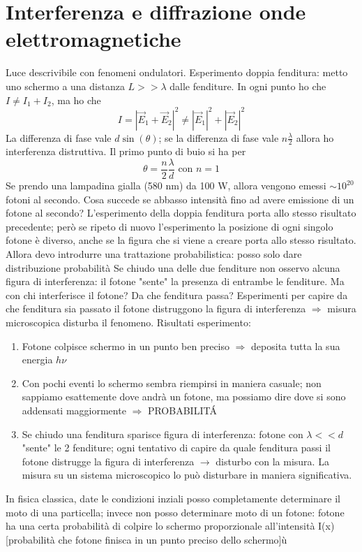 \documentclass[a4paper,11pt]{report}
\theoremstyle{remark}
\theoremstyle{definition}
\begin{document}
\chapter{Interferenza e diffrazione onde elettromagnetiche}
Luce descrivibile con fenomeni ondulatori. \newline
Esperimento doppia fenditura: metto uno schermo a una distanza $L >> \lambda$ dalle fenditure. In ogni punto ho che $ I \neq I_1 + I_2$, ma ho che 
\begin{equation*}
    I = {|\vec{E}_1 + \vec{E}_2|}^2 \neq {|\vec{E}_1|}^2 + {|\vec{E}_2|}^2
\end{equation*}
La differenza di fase vale $d\sin(\theta)$; se la differenza di fase vale $n\frac{\lambda}{2}$ allora ho interferenza distruttiva. Il primo punto di buio si ha per 
\begin{equation*}
    \theta = \frac{n}{2}\frac{\lambda}{d} \text{ con } n=1
\end{equation*}
Se prendo una lampadina gialla (580 nm) da 100 W, allora vengono emessi $\sim 10^{20}$ fotoni al secondo. Cosa succede se abbasso intensità fino ad avere emissione di un fotone al secondo? L'esperimento della doppia fenditura porta allo stesso risultato precedente; però se ripeto di nuovo l'esperimento la posizione di ogni singolo fotone è diverso, anche se la figura che si viene a creare porta allo stesso risultato. Allora devo introdurre una trattazione probabilistica: posso solo dare distribuzione probabilità \newline
Se chiudo una delle due fenditure non osservo alcuna figura di interferenza: il fotone "sente" la presenza di entrambe le fenditure. Ma con chi interferisce il fotone? Da che fenditura passa? \newline
Esperimenti per capire da che fenditura sia passato il fotone distruggono la figura di interferenza $\Rightarrow$ misura microscopica disturba il fenomeno. \newline
Risultati esperimento:
\begin{enumerate}
    \item Fotone colpisce schermo in un punto ben preciso $\Rightarrow$ deposita tutta la sua energia $h\nu$
    \item Con pochi eventi lo schermo sembra riempirsi in maniera casuale; non sappiamo esattemente dove andrà un fotone, ma possiamo dire dove si sono addensati maggiormente $\Rightarrow$ PROBABILIT\'A
    \item Se chiudo una fenditura sparisce figura di interferenza: fotone con $\lambda << d$ "sente" le 2 fenditure; ogni tentativo di capire da quale fenditura passi il fotone distrugge la figura di interferenza $\rightarrow$ disturbo con la misura. La misura su un sistema microscopico lo può disturbare in maniera significativa.
\end{enumerate}
In fisica classica, date le condizioni inziali posso completamente determinare il moto di una particella; invece non posso determinare moto di un fotone: fotone ha una certa probabilità di colpire lo schermo proporzionale all'intensità I(x) [probabilità che fotone finisca in un punto preciso dello schermo]ù
\end{document}
